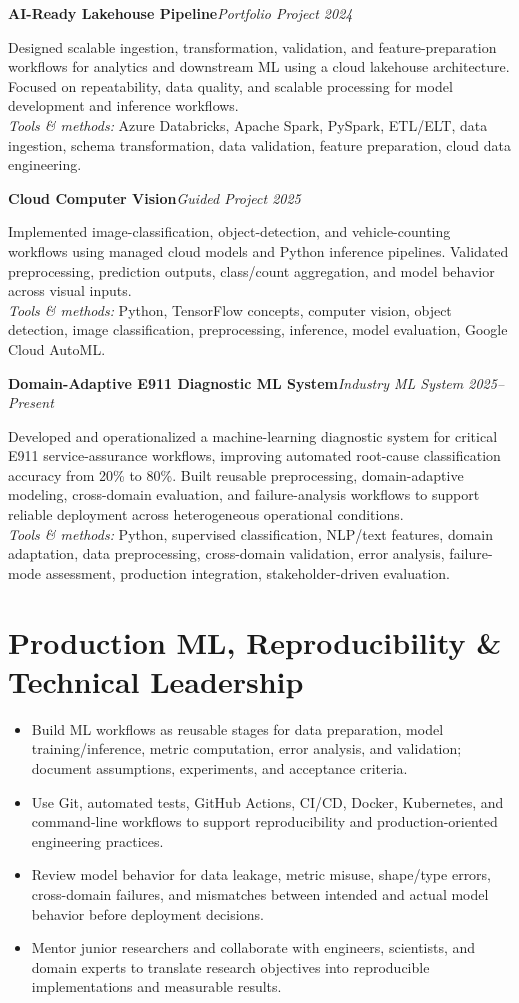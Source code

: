 \documentclass[10pt,letterpaper]{extarticle}
\newcommand{\project}[3]{\Needspace{3\baselineskip}\textbf{#1}\hfill\textit{#2 \textbar{} #3}\par}
\begin{document}
\project{AI-Ready Lakehouse Pipeline}{Portfolio Project}{2024}
Designed scalable ingestion, transformation, validation, and feature-preparation workflows for analytics and downstream ML using a cloud lakehouse architecture. Focused on repeatability, data quality, and scalable processing for model development and inference workflows.\\[-1pt]
{\small\textit{Tools \& methods:} Azure Databricks, Apache Spark, PySpark, ETL/ELT, data ingestion, schema transformation, data validation, feature preparation, cloud data engineering.}

\project{Cloud Computer Vision}{Guided Project}{2025}
Implemented image-classification, object-detection, and vehicle-counting workflows using managed cloud models and Python inference pipelines. Validated preprocessing, prediction outputs, class/count aggregation, and model behavior across visual inputs.\\[-1pt]
{\small\textit{Tools \& methods:} Python, TensorFlow concepts, computer vision, object detection, image classification, preprocessing, inference, model evaluation, Google Cloud AutoML.}

\project{Domain-Adaptive E911 Diagnostic ML System}{Industry ML System}{2025--Present}
Developed and operationalized a machine-learning diagnostic system for critical E911 service-assurance workflows, improving automated root-cause classification accuracy from 20\% to 80\%. Built reusable preprocessing, domain-adaptive modeling, cross-domain evaluation, and failure-analysis workflows to support reliable deployment across heterogeneous operational conditions.\\[-1pt]
{\small\textit{Tools \& methods:} Python, supervised classification, NLP/text features, domain adaptation, data preprocessing, cross-domain validation, error analysis, failure-mode assessment, production integration, stakeholder-driven evaluation.}

\section{Production ML, Reproducibility \& Technical Leadership}
\begin{itemize}
\item Build ML workflows as reusable stages for data preparation, model training/inference, metric computation, error analysis, and validation; document assumptions, experiments, and acceptance criteria.
\item Use Git, automated tests, GitHub Actions, CI/CD, Docker, Kubernetes, and command-line workflows to support reproducibility and production-oriented engineering practices.
\item Review model behavior for data leakage, metric misuse, shape/type errors, cross-domain failures, and mismatches between intended and actual model behavior before deployment decisions.
\item Mentor junior researchers and collaborate with engineers, scientists, and domain experts to translate research objectives into reproducible implementations and measurable results.
\end{itemize}
\end{document}
